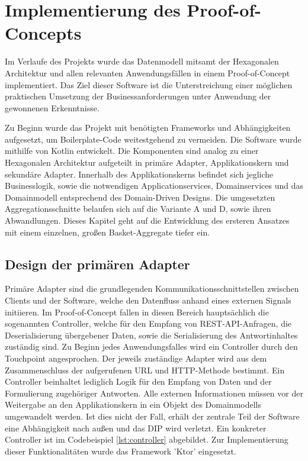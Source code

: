 \chapter{Implementierung des Proof-of-Concepts}

Im Verlaufe des Projekts wurde das Datenmodell mitsamt der Hexagonalen Architektur und allen relevanten Anwendungsfällen in einem Proof-of-Concept implementiert. Das Ziel dieser Software ist die Unterstreichung einer möglichen praktischen Umsetzung der Businessanforderungen unter Anwendung der gewonnenen Erkenntnisse. 

Zu Beginn wurde das Projekt mit benötigten Frameworks und Abhängigkeiten aufgesetzt, um \gls{Boilerplate-Code} weitestgehend zu vermeiden. Die Software wurde mithilfe von Kotlin entwickelt. Die Komponenten sind analog zu einer Hexagonalen Architektur aufgeteilt in primäre Adapter, Applikationskern und sekundäre Adapter. Innerhalb des Applikationskerns befindet sich jegliche Businesslogik, sowie die notwendigen Applicationservices, Domainservices und das Domainmodell entsprechend des Domain-Driven Designs. Die umgesetzten Aggregationsschnitte belaufen sich auf die Variante A und D, sowie ihren Abwandlungen. Dieses Kapitel geht auf die Entwicklung des ersteren Ansatzes mit einem einzelnen, großen Basket-Aggregate tiefer ein.

\section{Design der primären Adapter}

Primäre Adapter sind die grundlegenden Kommunikationsschnittstellen zwischen Clients und der Software, welche den Datenfluss anhand eines externen Signals initiieren. Im Proof-of-Concept fallen in diesen Bereich hauptsächlich die sogenannten Controller, welche für den Empfang von REST-API-Anfragen, die Deserialisierung übergebener Daten, sowie die Serialisierung des Antwortinhaltes zuständig sind. Zu Beginn jedes Anwendungsfalles wird ein Controller durch den Touchpoint angesprochen. Der jeweils zuständige Adapter wird aus dem Zusammenschluss der aufgerufenen URL und HTTP-Methode bestimmt. Ein Controller beinhaltet lediglich Logik für den Empfang von Daten und der Formulierung zugehöriger Antworten. Alle externen Informationen müssen vor der Weitergabe an den Applikationskern in ein Objekt des Domainmodells umgewandelt werden. Ist dies nicht der Fall, erhält der zentrale Teil der Software eine Abhängigkeit nach außen und das \acrlong{DIP} wird verletzt. Ein konkreter Controller ist im Codebeispiel \ref{lst:controller} abgebildet. Zur Implementierung dieser Funktionalitäten wurde das Framework 'Ktor' eingesetzt.

